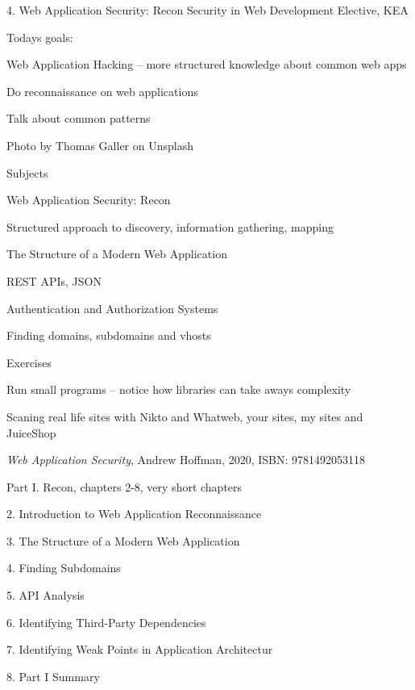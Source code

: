 \documentclass[Screen16to9,17pt]{foils}
\begin{document}
\mytitlepage
{4. Web Application Security: Recon}
{Security in Web Development Elective, KEA}



Todays goals:
\begin{list2}
\item Web Application Hacking -- more structured knowledge about common web apps
\item Do reconnaissance on web applications
\item Talk about common patterns
\end{list2}

Photo by Thomas Galler on Unsplash




\begin{list1}
\item Subjects
\item Web Application Security: Recon
\begin{list2}
\item Structured approach to discovery, information gathering, mapping
\item The Structure of a Modern Web Application
\item REST APIs, JSON
\item Authentication and Authorization Systems
\item Finding domains, subdomains and vhosts
\end{list2}
\item Exercises
\begin{list2}
\item Run small programs -- notice how libraries can take aways complexity
\item Scaning real life sites with Nikto and Whatweb, your sites, my sites and JuiceShop
\end{list2}
\end{list1}



\emph{Web Application Security}, Andrew Hoffman, 2020, ISBN: 9781492053118

\begin{list1}
\item Part I. Recon, chapters 2-8, very short chapters
\item 2. Introduction to Web Application Reconnaissance
\item 3. The Structure of a Modern Web Application
\item 4. Finding Subdomains
\item 5. API Analysis
\item 6. Identifying Third-Party Dependencies
\item 7. Identifying Weak Points in Application Architectur
\item 8. Part I Summary
\end{list1}
\end{document}
